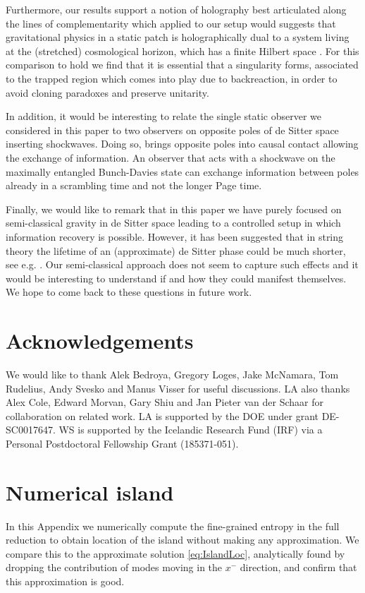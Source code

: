 \documentclass[a4paper,11pt]{article}
\numberwithin{equation}{section}
\begin{document}
Furthermore, our results support a notion of holography best articulated along the lines of complementarity which applied to our setup would suggests that gravitational physics in a static patch is holographically dual to a system living at the (stretched) cosmological horizon, which has a finite Hilbert space \cite{Susskind:1993if,Susskind:2021}. For this comparison to hold we find that it is essential that a singularity forms, associated to the trapped region which comes into play due to backreaction, in order to avoid cloning paradoxes and preserve unitarity.

In addition, it would be interesting to relate the single static observer we considered in this paper to two observers on opposite poles of de Sitter space inserting shockwaves. Doing so, brings opposite poles into causal contact \cite{Gao:2000ga,Aalsma:2020aib} allowing the exchange of information. An observer that acts with a shockwave on the maximally entangled Bunch-Davies state can exchange information between poles already in a scrambling time \cite{Aalsma:2021xxx} and not the longer Page time.

Finally, we would like to remark that in this paper we have purely focused on semi-classical gravity in de Sitter space leading to a controlled setup in which information recovery is possible. However, it has been suggested that in string theory the lifetime of an (approximate) de Sitter phase could be much shorter, see e.g. \cite{Garg:2018reu,Ooguri:2018wrx,Montero:2019ekk,Bedroya:2019snp,Montero:2020rpl,Blumenhagen:2020doa,Rudelius:2021oaz}. Our semi-classical approach does not seem to capture such effects and it would be interesting to understand if and how they could manifest themselves. We hope to come back to these questions in future work.

\section*{Acknowledgements}
%
We would like to thank Alek Bedroya, Gregory Loges, Jake McNamara, Tom Rudelius, Andy Svesko and Manus Visser for useful discussions. LA also thanks Alex Cole, Edward Morvan, Gary Shiu and Jan Pieter van der Schaar for collaboration on related work. LA is supported by the DOE under grant DE-SC0017647. WS is supported by the Icelandic Research Fund (IRF) via a Personal Postdoctoral Fellowship Grant (185371-051).


\appendix

\section{Numerical island} \label{app:numerical}
%
In this Appendix we numerically compute the fine-grained entropy in the full reduction to obtain location of the island without making any approximation. We compare this to the approximate solution \eqref{eq:IslandLoc}, analytically found by dropping the contribution of modes moving in the $x^-$ direction, and confirm that this approximation is good.
\end{document}
